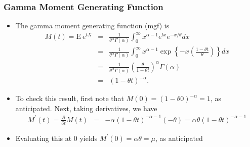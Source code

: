 \documentclass{beamer}
\begin{document}
\begin{frame}[shrink=2]
\frametitle{Gamma Moment Generating Function}
\begin{itemize}
\item The gamma moment generating function (mgf) is
\begin{eqnarray*}
M(t) = \mathrm{E~} e^{tX} &=& \frac{1}{\theta^{\alpha}\Gamma(\alpha)}\int_0 ^{\infty} x^{\alpha-1} e^{tx} e^{-x/\theta} dx\\
&=& \frac{1}{\theta^{\alpha}\Gamma(\alpha)}\int_0 ^{\infty} x^{\alpha-1} \exp\left\{-x\left(\frac{1-\theta t}{\theta}\right)\right\} dx\\
&=& \frac{1}{\theta^{\alpha}\Gamma(\alpha)} \left(\frac{\theta}{1-\theta t}\right)^{\alpha} \Gamma(\alpha)\\
&=& (1 - \theta t)^{-\alpha} .
\end{eqnarray*}
\item To check this result, first note that $M(0) = (1 - \theta 0)^{-\alpha} = 1$, as anticipated. Next, taking derivatives, we have
\begin{eqnarray*}
M^{\prime}(t) = \frac{\partial}{\partial t} M(t) &=& -\alpha (1 - \theta t)^{-\alpha - 1}(-\theta) = \alpha \theta (1 - \theta t)^{-\alpha - 1}
\end{eqnarray*}
\item Evaluating this at 0 yields $M^{\prime}(0) = \alpha \theta =\mu$, as anticipated
\end{itemize}
\end{frame}
\end{document}

